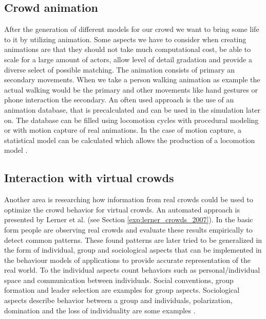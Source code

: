 \documentclass{acmsiggraph}               %
\begin{document}
\subsection{Crowd animation}

After the generation of different models for our crowd we want to bring some life to it by utilizing animation. Some aspects we have to consider when creating animations are that they should not take much computational cost, be able to scale for a large amount of actors, allow level of detail gradation and provide a diverse select of possible matching. The animation consists of primary an secondary movements. When we take a person walking animation as example the actual walking would be the primary and other movements like hand gestures or phone interaction the secondary.
An often used approach is the use of an animation database, that is precalculated and can be used in the simulation later on. The database can be filled using locomotion cycles with procedural modeling or with motion capture of real animations. In the case of motion capture, a statistical model can be calculated which allows the production of a locomotion model \cite{thalmann_crowd_2013}.

\subsection{Interaction with virtual crowds}

Another area is researching how information from real crowds could be used to optimize the crowd behavior for virtual crowds. An automated approach is presented by Lerner et al.  (see Section \ref{exp:lerner_crowds_2007}). In the basic form people are observing real crowds and evaluate these results empirically to detect common patterns. These found patterns are later tried to be generalized in the form of individual, group and sociological aspects that can be implemented in the behaviour models of applications to provide accurate representation of the real world. To the individual aspects count behaviors such as personal/individual space and communication between individuals. Social conventions, group formation and leader selection are examples for group aspects. Sociological aspects describe behavior between a group and individuals, polarization, domination and the loss of individuality are some examples \cite{benesch_atlas_1995} \cite{jeffrey_social_conventions_1998} \cite{mannoni_psychologie_1994}.  
\end{document}
